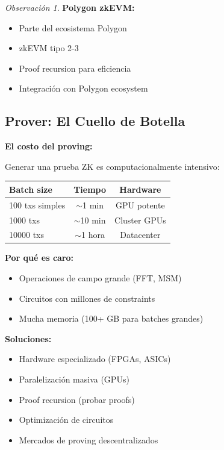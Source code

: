 \documentclass[11pt,a4paper,twoside,openright]{book}
\theoremstyle{definition}
\theoremstyle{plain}
\theoremstyle{remark}
\newtheorem{remark}{Observación}[chapter]
\begin{document}
\begin{remark}
\textbf{Polygon zkEVM:}
\begin{itemize}
    \item Parte del ecosistema Polygon
    \item zkEVM tipo 2-3
    \item Proof recursion para eficiencia
    \item Integración con Polygon ecosystem
\end{itemize}
\end{remark}

\subsection{Prover: El Cuello de Botella}

\begin{advertencia}
\textbf{El costo del proving:}

Generar una prueba ZK es computacionalmente intensivo:

\begin{center}
\begin{tabular}{lcc}
\toprule
\textbf{Batch size} & \textbf{Tiempo} & \textbf{Hardware} \\
\midrule
100 txs simples & $\sim$1 min & GPU potente \\
1000 txs & $\sim$10 min & Cluster GPUs \\
10000 txs & $\sim$1 hora & Datacenter \\
\bottomrule
\end{tabular}
\end{center}

\textbf{Por qué es caro:}
\begin{itemize}
    \item Operaciones de campo grande (FFT, MSM)
    \item Circuitos con millones de constraints
    \item Mucha memoria (100+ GB para batches grandes)
\end{itemize}

\textbf{Soluciones:}
\begin{itemize}
    \item Hardware especializado (FPGAs, ASICs)
    \item Paralelización masiva (GPUs)
    \item Proof recursion (probar proofs)
    \item Optimización de circuitos
    \item Mercados de proving descentralizados
\end{itemize}
\end{advertencia}
\end{document}

